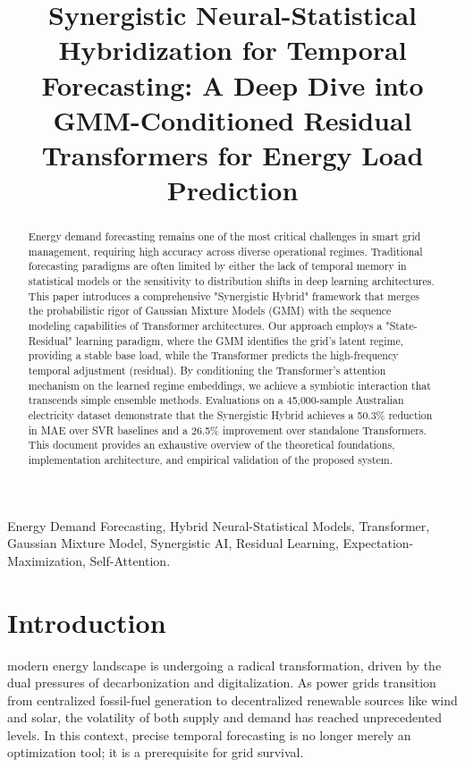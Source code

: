 \documentclass[conference]{IEEEtran}
\begin{document}
\title{Synergistic Neural-Statistical Hybridization for Temporal Forecasting: A Deep Dive into GMM-Conditioned Residual Transformers for Energy Load Prediction}

\author{
}

\maketitle

\begin{abstract}
Energy demand forecasting remains one of the most critical challenges in smart grid management, requiring high accuracy across diverse operational regimes. Traditional forecasting paradigms are often limited by either the lack of temporal memory in statistical models or the sensitivity to distribution shifts in deep learning architectures. This paper introduces a comprehensive "Synergistic Hybrid" framework that merges the probabilistic rigor of Gaussian Mixture Models (GMM) with the sequence modeling capabilities of Transformer architectures. Our approach employs a "State-Residual" learning paradigm, where the GMM identifies the grid's latent regime, providing a stable base load, while the Transformer predicts the high-frequency temporal adjustment (residual). By conditioning the Transformer's attention mechanism on the learned regime embeddings, we achieve a symbiotic interaction that transcends simple ensemble methods. Evaluations on a 45,000-sample Australian electricity dataset demonstrate that the Synergistic Hybrid achieves a 50.3\% reduction in MAE over SVR baselines and a 26.5\% improvement over standalone Transformers. This document provides an exhaustive overview of the theoretical foundations, implementation architecture, and empirical validation of the proposed system.
\end{abstract}

\begin{IEEEkeywords}
Energy Demand Forecasting, Hybrid Neural-Statistical Models, Transformer, Gaussian Mixture Model, Synergistic AI, Residual Learning, Expectation-Maximization, Self-Attention.
\end{IEEEkeywords}

\section{Introduction}
 modern energy landscape is undergoing a radical transformation, driven by the dual pressures of decarbonization and digitalization. As power grids transition from centralized fossil-fuel generation to decentralized renewable sources like wind and solar, the volatility of both supply and demand has reached unprecedented levels. In this context, precise temporal forecasting is no longer merely an optimization tool; it is a prerequisite for grid survival.
\end{document}
